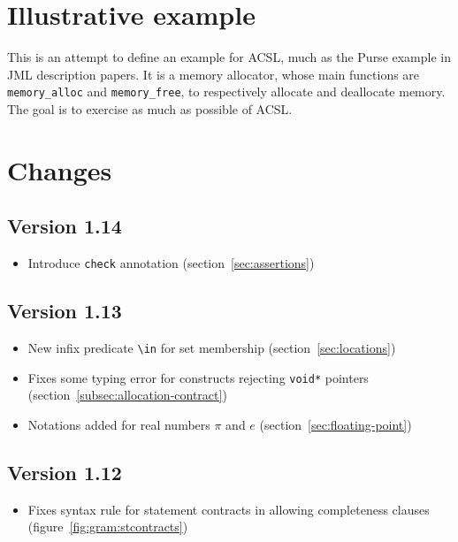 \documentclass[web]{frama-c-book}
\begin{document}
\pagebreak


\pagebreak


\pagebreak


\pagebreak


\pagebreak


\section{Illustrative example}
\label{sec:illustrative-example}
This is an attempt to define an example for ACSL, much as the Purse
example in JML description papers.  It is a memory allocator, whose
main functions are \lstinline|memory_alloc| and \lstinline|memory_free|, to
respectively allocate and deallocate memory.  The goal is to exercise
as much as possible of ACSL.

%

\section{Changes}

\subsection{Version 1.14} %
\begin{itemize}
\item Introduce \lstinline|check| annotation (section~\ref{sec:assertions})
\end{itemize}

\subsection{Version 1.13} %
\begin{itemize}
\item New infix predicate \lstinline|\in| for set membership
  (section~\ref{sec:locations})
\item Fixes some typing error for constructs rejecting \lstinline|void*| pointers (section~\ref{subsec:allocation-contract})
\item Notations added for real numbers $\pi$ and $e$ (section~\ref{sec:floating-point})
\end{itemize}

\subsection{Version 1.12} %
\begin{itemize}
\item Fixes syntax rule for statement contracts in allowing completeness clauses
  (figure~\ref{fig:gram:stcontracts})
\end{itemize}
\end{document}
